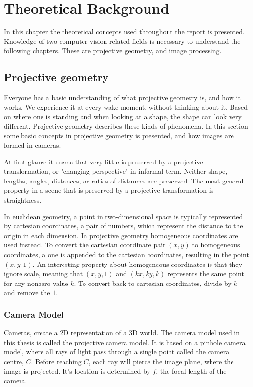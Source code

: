 \chapter{Theoretical Background}

In this chapter the theoretical concepts used throughout the report is presented. Knowledge of two computer vision related fields is necessary to understand the following chapters. These are projective geometry, and image processing.

\section{Projective geometry}
Everyone has a basic understanding of what projective geometry is, and how it works.
We experience it at every wake moment, without thinking about it. 
Based on where one is standing and when looking at a shape, the shape can look very different. %
Projective geometry describes these kinds of phenomena.
In this section some basic concepts in projective geometry is presented, and how images are formed in cameras.

At first glance it seems that very little is preserved by a projective transformation, or "changing perspective" in informal term.
Neither shape, lengths, angles, distances, or ratios of distances are preserved.
The most general property in a scene that is preserved by a projective transformation is straightness. \cite[1]{hartley-zisserman}

In euclidean geometry, a point in two-dimensional space is typically represented by cartesian coordinates, a pair of numbers, which represent the distance to the origin in each dimension. %
In projective geometry homogeneous coordinates are used instead.
To convert the cartesian coordinate pair $(x,y)$ to homogeneous coordinates, a one is appended to the cartesian coordinates, resulting in the point $(x,y,1)$. 
An interesting property about homogeneous coordinates is that they ignore scale, meaning that $(x,y,1)$ and $(kx,ky,k)$ represents the same point for any nonzero value $k$.
To convert back to cartesian coordinates, divide by $k$ and remove the $1$.\cite[2]{hartley-zisserman} %

\subsection{Camera Model}\label{camera-model}
Cameras, create a 2D representation of a 3D world.
The camera model used in this thesis is called the projective camera model.
It is based on a pinhole camera model, where all rays of light pass through a single point called the camera centre, $C$. Before reaching $C$, each ray will pierce the image plane, where the image is projected.
It's location is determined by $f$, the focal length of the camera.

